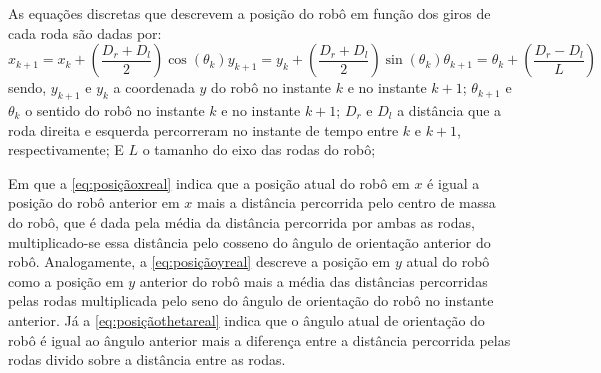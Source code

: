 As equações discretas que descrevem a posição do robô em função dos giros de cada roda são dadas por:
\begin{subequations}
	\begin{equation}
	x_{k+1} = x_{k} + \left (\dfrac{D_{r} + D_{l}}{2} \right) \cos(\theta_{k}) 
	\label{eq:posiçãoxreal}
	\end{equation}
	\begin{equation}
	y_{k+1} = y_{k} + \left(\dfrac{D_{r} + D_{l}}{2}\right)\sin(\theta_{k}) 
	\label{eq:posiçãoyreal}
	\end{equation}
	\begin{equation}
	\theta_{k+1} = \theta_{k} + \left(\dfrac{D_{r} - D_{l}}{L}\right)
	\label{eq:posiçãothetareal}
	\end{equation}
	\label{eq:posicaorealEnc}
\end{subequations}
sendo, $y_{k+1}$ e $y_{k}$ a coordenada $y$ do robô no instante $k$ e no instante $k+1$; $\theta_{k+1}$ e $\theta_{k}$ o sentido do robô no instante $k$ e no instante $k+1$; $D_{r}$ e $D_{l}$ a distância que a roda direita e esquerda percorreram no instante de tempo entre $k$ e $k+1$, respectivamente; E $L$ o tamanho do eixo das rodas do robô;

Em que a \autoref{eq:posiçãoxreal} indica que a posição atual do robô em $x$ é igual a posição do robô anterior em $x$ mais a distância percorrida pelo centro de massa do robô, que é dada pela média da distância percorrida por ambas as rodas, multiplicado-se essa distância pelo cosseno do ângulo de orientação anterior do robô. Analogamente, a \autoref{eq:posiçãoyreal} descreve a posição em $y$ atual do robô como a posição em $y$ anterior do robô mais a média das distâncias percorridas pelas rodas multiplicada pelo seno do ângulo de orientação do robô no instante anterior. Já a \autoref{eq:posiçãothetareal} indica que o ângulo atual de orientação do robô é igual ao ângulo anterior mais a diferença entre a distância percorrida pelas rodas divido sobre a distância entre as rodas. 

